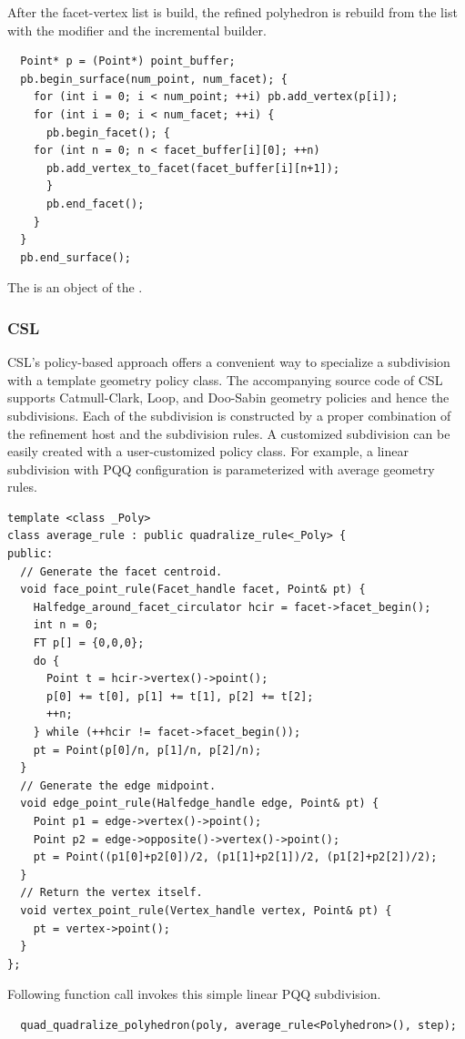 After the facet-vertex list is build, 
the refined polyhedron is rebuild from the list with the 
modifier and the incremental builder.
\begin{lstlisting}
  Point* p = (Point*) point_buffer;
  pb.begin_surface(num_point, num_facet); {
    for (int i = 0; i < num_point; ++i) pb.add_vertex(p[i]);	
    for (int i = 0; i < num_facet; ++i) {
      pb.begin_facet(); {
	for (int n = 0; n < facet_buffer[i][0]; ++n)
	  pb.add_vertex_to_facet(facet_buffer[i][n+1]);
      }
      pb.end_facet();
    }
  }
  pb.end_surface();
\end{lstlisting}
The  is an object of the 
.

\subsubsection*{CSL}
CSL's policy-based approach offers a convenient way to specialize a
subdivision with a template geometry policy class.  The accompanying
source code of CSL supports Catmull-Clark, Loop, and Doo-Sabin
geometry policies and hence the subdivisions.  Each of the subdivision
is constructed by a proper combination of the refinement host and the
subdivision rules.  A customized subdivision can be easily created with a
user-customized policy class. For example, a linear subdivision with
PQQ configuration is parameterized with average geometry rules.
\begin{lstlisting}
template <class _Poly>
class average_rule : public quadralize_rule<_Poly> {
public:
  // Generate the facet centroid.
  void face_point_rule(Facet_handle facet, Point& pt) {
    Halfedge_around_facet_circulator hcir = facet->facet_begin();
    int n = 0;
    FT p[] = {0,0,0};
    do {
      Point t = hcir->vertex()->point();
      p[0] += t[0], p[1] += t[1], p[2] += t[2]; 
      ++n;
    } while (++hcir != facet->facet_begin());
    pt = Point(p[0]/n, p[1]/n, p[2]/n);
  }
  // Generate the edge midpoint.
  void edge_point_rule(Halfedge_handle edge, Point& pt) {
    Point p1 = edge->vertex()->point();
    Point p2 = edge->opposite()->vertex()->point();
    pt = Point((p1[0]+p2[0])/2, (p1[1]+p2[1])/2, (p1[2]+p2[2])/2);
  }
  // Return the vertex itself.
  void vertex_point_rule(Vertex_handle vertex, Point& pt) {
    pt = vertex->point();
  }
};
\end{lstlisting}
Following function call invokes this simple linear PQQ subdivision.
\begin{lstlisting}
  quad_quadralize_polyhedron(poly, average_rule<Polyhedron>(), step);
\end{lstlisting}

